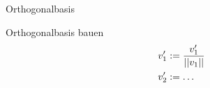 \documentclass[class=article, crop=false]{standalone}
\begin{document}
\begin{zettel}{Orthogonalbasis}
\begin{flashcard}
    Orthogonalbasis bauen
    \begin{align*}
        v_1' &:= \frac{v_1'}{ \left|\left|v_1\right|\right|}\\
        v_2' &:= \dots
    \end{align*}


\end{flashcard}
\end{zettel}
\end{document}
